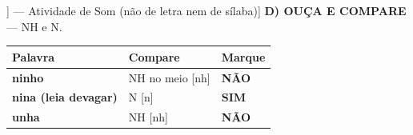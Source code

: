 \begin{exercicio}[Som /nh/ [[\textltailn]] --- Atividade de Som (não de letra nem de sílaba)]
\textbf{D) OUÇA E COMPARE} --- NH e N.

\begin{center}
\begin{tabular}{@{}p{4.2cm}p{6.2cm}p{1.6cm}@{}}
\hline
\textbf{Palavra} & \textbf{Compare} & \textbf{Marque} \\
\hline
\textbf{ninho} & NH no meio [nh] & \textbf{NÃO} \\
\textbf{nina (leia devagar)} & N [n] & \textbf{SIM} \\
\textbf{unha} & NH [nh] & \textbf{NÃO} \\
\hline
\end{tabular}
\end{center}

\end{exercicio}

